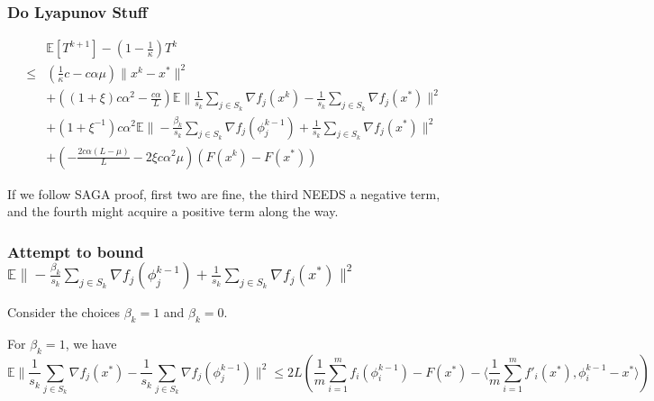 \documentclass[12pt]{article}
\begin{document}
		\subsubsection{Do Lyapunov Stuff}
		
			\begin{align*}
				&\mathbb{E}\left[ T^{k+1} \right] - \left(1-\frac{1}{\kappa} \right) T^k \\
				\leq  &( \frac{1}{\kappa}c-c \alpha \mu)\|x^k - x^* \|^2 \\
		&+ ((1+\xi)c \alpha^2 - \frac{c \alpha }{L})\mathbb{E} \| \frac{1}{s_k} \sum_{j \in S_k}   \nabla f_j(x^k) -\frac{1}{s_k} \sum_{j \in S_k}   \nabla f_j(x^*) \|^2\\
		&+(1+\xi^{-1})c \alpha^2\mathbb{E}   \|  - \frac{ \beta_k }{s_k} \sum_{j \in S_k}  \nabla f_j(\phi^{k-1}_j) + \frac{ 1}{s_k} \sum_{j \in S_k}  \nabla f_j(x^*)\|^2 \\
	&+( -\frac{2c \alpha(L - \mu)}{L}- 2 \xi c \alpha^2 \mu) (F(x^k) - F(x^*))
				\end{align*}
		
		If we follow SAGA proof, first two are fine, the third NEEDS a negative term, and the fourth might acquire a positive term along the way. 
		
		
		\subsubsection{Attempt to bound $\mathbb{E}   \|  - \frac{ \beta_k }{s_k} \sum_{j \in S_k}  \nabla f_j(\phi^{k-1}_j) + \frac{ 1}{s_k} \sum_{j \in S_k}  \nabla f_j(x^*)\|^2 $}
		 
		Consider the choices $\beta_k=1$ and $\beta_k=0$.
		
		For $\beta_k=1$, we have 
		\begin{equation}
			\mathbb{E} \| \frac{1 }{s_k} \sum_{j \in S_k}  \nabla f_j(x^*) -\frac{1 }{s_k} \sum_{j \in S_k}  \nabla f_j(\phi^{k-1}_j)\|^2  \leq 2L(\frac{1}{m}\sum_{i =1}^{m}  f_i(\phi_i^{k-1})   - F(x^*)  -  \langle \frac{1 }{m} \sum_{i =1}^{m}   f'_i(x^*), \phi_i^{k-1} - x^*\rangle)
		\end{equation}
		
\end{document}
